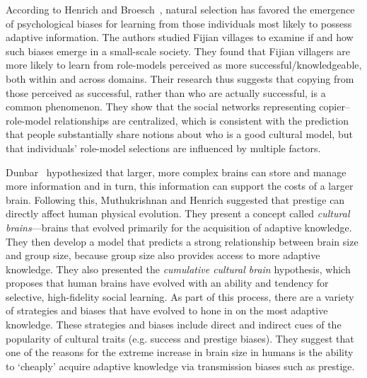 \documentclass[12pt]{extarticle}
\begin{document}
According to Henrich and Broesch~\citep{fijian_social_bias}, natural selection has favored the emergence of psychological biases for learning from those individuals most likely to possess adaptive information. 
The authors studied Fijian villages to examine if and how such biases emerge in a small-scale society.
They found that Fijian villagers are more likely to learn from role-models perceived as more successful/knowledgeable, both within and across domains. Their research thus suggests that copying from those perceived as successful, rather than who are actually successful, is a common phenomenon. They show that the social networks representing copier--role-model relationships are centralized, which is consistent with the prediction that people substantially share notions about who is a good cultural model, but that individuals' role-model selections are influenced by multiple factors.

Dunbar~\citep{social_brains} hypothesized that larger, more complex brains can store and manage more information and in turn, this information can support the costs of a larger brain.
Following this, Muthukrishnan and Henrich \citep{collective_brains} suggested that prestige can directly affect human physical evolution. They present a concept called \emph{cultural brains}---brains that evolved primarily for the acquisition of adaptive knowledge.
They then develop a model that predicts a strong relationship between brain size and group size, because group size also provides access to more adaptive knowledge. 
They also presented the \emph{cumulative cultural brain} hypothesis, which proposes that human brains have evolved with an ability and tendency for selective, high-fidelity social learning. As part of this process, there are a variety of strategies and biases that have evolved to hone in on the most adaptive knowledge. These strategies and biases include direct and indirect cues of the popularity of cultural traits (e.g. success and prestige biases).
They suggest that one of the reasons for the extreme increase in brain size in humans is the ability to `cheaply' acquire adaptive knowledge via transmission biases such as prestige.
\end{document}
